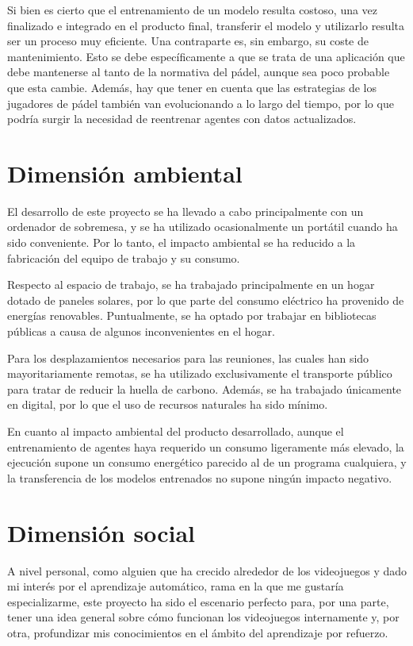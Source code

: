 Si bien es cierto que el entrenamiento de un modelo resulta costoso, una vez finalizado e integrado en el producto final, transferir el modelo y utilizarlo resulta ser un proceso muy eficiente. Una contraparte es, sin embargo, su coste de mantenimiento. Esto se debe específicamente a que se trata de una aplicación que debe mantenerse al tanto de la normativa del pádel, aunque sea poco probable que esta cambie. Además, hay que tener en cuenta que las estrategias de los jugadores de pádel también van evolucionando a lo largo del tiempo, por lo que podría surgir la necesidad de reentrenar agentes con datos actualizados.

\newpage

\section{Dimensión ambiental}

El desarrollo de este proyecto se ha llevado a cabo principalmente con un ordenador de sobremesa, y se ha utilizado ocasionalmente un portátil cuando ha sido conveniente. Por lo tanto, el impacto ambiental se ha reducido a la fabricación del equipo de trabajo y su consumo.

Respecto al espacio de trabajo, se ha trabajado principalmente en un hogar dotado de paneles solares, por lo que parte del consumo eléctrico ha provenido de energías renovables. Puntualmente, se ha optado por trabajar en bibliotecas públicas a causa de algunos inconvenientes en el hogar.

Para los desplazamientos necesarios para las reuniones, las cuales han sido mayoritariamente remotas, se ha utilizado exclusivamente el transporte público para tratar de reducir la huella de carbono. Además, se ha trabajado únicamente en digital, por lo que el uso de recursos naturales ha sido mínimo.

En cuanto al impacto ambiental del producto desarrollado, aunque el entrenamiento de agentes haya requerido un consumo ligeramente más elevado, la ejecución supone un consumo energético parecido al de un programa cualquiera, y la transferencia de los modelos entrenados no supone ningún impacto negativo.

\section{Dimensión social}

A nivel personal, como alguien que ha crecido alrededor de los videojuegos y dado mi interés por el aprendizaje automático, rama en la que me gustaría especializarme, este proyecto ha sido el escenario perfecto para, por una parte, tener una idea general sobre cómo funcionan los videojuegos internamente y, por otra, profundizar mis conocimientos en el ámbito del aprendizaje por refuerzo.

